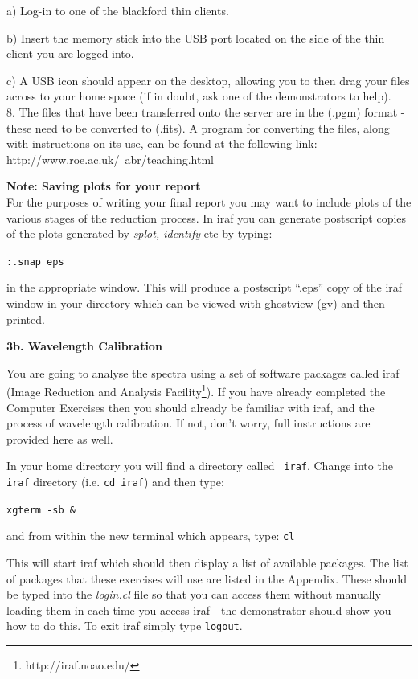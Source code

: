 \documentclass[12pt]{article}
\begin{document}
a) Log-in to one of the blackford thin clients.\\

\medskip

b) Insert the memory stick into the USB port located on the side of the thin
client you are logged into.\\

\medskip

c) A USB icon should appear on the desktop, allowing you to then drag your files across
to your home space (if in doubt, ask one of the demonstrators to help).\\

8. The files that have been transferred onto the server are in the (.pgm) format - these need to be converted to (.fits).  A program for converting the files, along with instructions on its use, can be found at the following link: http://www.roe.ac.uk/~abr/teaching.html

\medskip

{\large {\bf Note: Saving plots for your report}}\\
For the purposes of writing your final report you may want to include
plots of the various stages of the reduction process. In {\sc iraf} you can generate
postscript copies of the plots generated by {\it splot, identify} etc
by typing: 

{\tt :.snap eps}

in the appropriate window. This will produce a postscript ``.eps''
copy of the {\sc iraf} window in your directory which can be viewed
with ghostview (gv) and then printed.

\newpage


{\bf 3b. Wavelength Calibration}

\noindent
You are going to analyse the spectra using a set of software packages 
called {\sc iraf} (Image Reduction and Analysis
Facility\footnote{http://iraf.noao.edu/}). If you have already
completed the Computer Exercises then you should already be familiar
with {\sc iraf}, and the process of wavelength calibration. If not,
don't worry, full instructions are provided here as well.

In your home directory you will find a directory called {\tt
  iraf}. Change into the {\tt iraf} directory (i.e. {\tt cd iraf}) and
  then type:

{\tt \verb,xgterm -sb &,}

\noindent
and from within the new terminal which appears, type: {\tt cl}

\noindent
This will start {\sc iraf} which should then display a list of available
packages. The list of packages that these exercises will use are listed in the Appendix. These should be typed into the {\it login.cl} file so that you can access them without manually loading them in each time you access {\sc iraf} - the demonstrator should show you how to do this. To exit {\sc iraf} simply type {\tt logout}.
\end{document}
